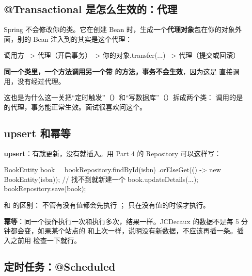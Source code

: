 \subsection{@Transactional 是怎么生效的：代理}

Spring 不会修改你的类。它在创建 Bean 时，生成一个\textbf{代理对象}包在你的对象外面，别的 Bean 注入到的其实是这个代理：

\begin{plaincode}
调用方 --> 代理（开启事务）--> 你的对象.transfer(...) --> 代理（提交或回滚）
\end{plaincode}

\begin{note}
\textbf{同一个类里，一个方法调用另一个带  的方法，事务不会生效}，因为这是  直接调用，没有经过代理。

这也是为什么这一关把“定时触发”（）和“写数据库”（）拆成两个类： 调用的是  的代理，事务能正常生效。面试很喜欢问这个。
\end{note}

\subsection{upsert 和幂等}

\textbf{upsert}：有就更新，没有就插入。用 Part 4 的 Repository 可以这样写：

\begin{java}
BookEntity book = bookRepository.findById(isbn)
        .orElseGet(() -> new BookEntity(isbn));   // 找不到就新建一个
book.updateDetails(...);
bookRepository.save(book);
\end{java}

 和  的区别： 不管有没有值都会先执行 ； 只在没有值的时候才执行。

\textbf{幂等}：同一个操作执行一次和执行多次，结果一样。JCDecaux 的数据不是每 5 分钟都会变，如果某个站点的  和上次一样，说明没有新数据，不应该再插一条。插入之前用  检查一下就行。

\subsection{定时任务：@Scheduled}


